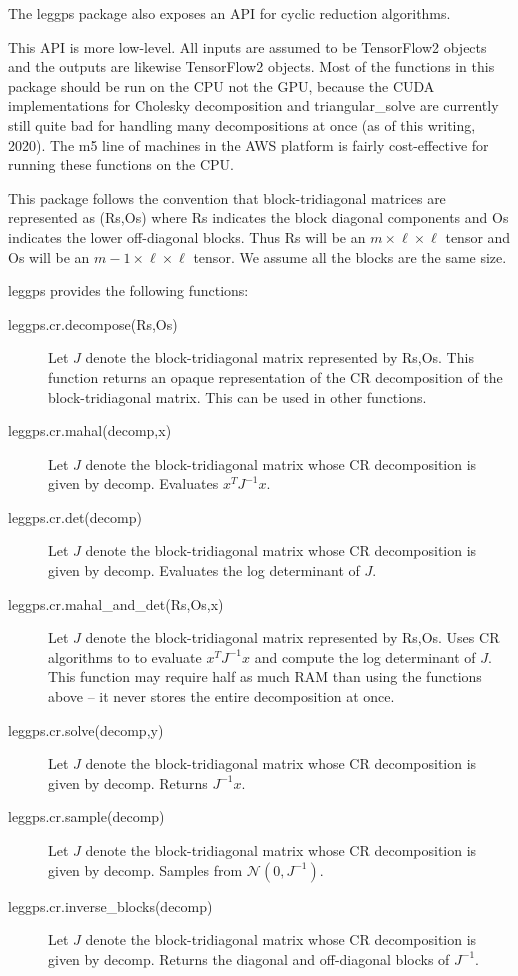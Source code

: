 \documentclass{article}
\theoremstyle{definition}
\begin{document}
The leggps package also exposes an API for cyclic reduction algorithms.  

This API is more low-level. All inputs are assumed to be TensorFlow2 objects and the outputs are likewise TensorFlow2 objects.  Most of the functions in this package should be run on the CPU not the GPU, because the CUDA implementations for Cholesky decomposition and triangular\_solve are currently still quite bad for handling many decompositions at once (as of this writing, 2020).   The m5 line of machines in the AWS platform is fairly cost-effective for running these functions on the CPU.

This package follows the convention that block-tridiagonal matrices are represented as (Rs,Os) where Rs indicates the block diagonal components and Os indicates the lower off-diagonal blocks.  Thus Rs will be an $m\times \ell \times \ell$ tensor and Os will be an $m-1 \times \ell \times \ell$ tensor.  We assume all the blocks are the same size.

leggps provides the following functions:

\begin{description}
    \item[leggps.cr.decompose(Rs,Os)] Let $J$ denote the block-tridiagonal matrix represented by Rs,Os.  This function returns an opaque representation of the CR decomposition of the block-tridiagonal matrix.  This can be used in other functions.
    \item[leggps.cr.mahal(decomp,x)] Let $J$ denote the block-tridiagonal matrix whose CR decomposition is given by decomp.  Evaluates $x^T J^{-1} x$.
    \item[leggps.cr.det(decomp)] Let $J$ denote the block-tridiagonal matrix whose CR decomposition is given by decomp.  Evaluates the log determinant of $J$.
    \item[leggps.cr.mahal\_and\_det(Rs,Os,x)] Let $J$ denote the block-tridiagonal matrix represented by Rs,Os.  Uses CR algorithms to to evaluate $x^T J^{-1} x$ and compute the log determinant of $J$.   This function may require half as much RAM than using the functions above -- it never stores the entire decomposition at once.
    \item[leggps.cr.solve(decomp,y)] Let $J$ denote the block-tridiagonal matrix whose CR decomposition is given by decomp.  Returns $J^{-1} x$.
    \item[leggps.cr.sample(decomp)] Let $J$ denote the block-tridiagonal matrix whose CR decomposition is given by decomp.  Samples from $\mathcal{N}(0,J^{-1})$.
    \item[leggps.cr.inverse\_blocks(decomp)] Let $J$ denote the block-tridiagonal matrix whose CR decomposition is given by decomp.  Returns the diagonal and off-diagonal blocks of $J^{-1}$.
\end{description}
\end{document}
